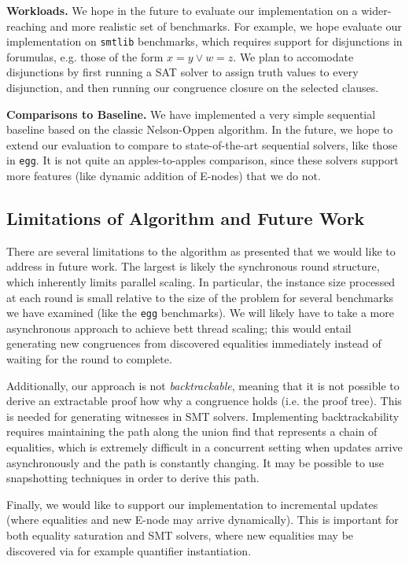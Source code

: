 \textbf{Workloads.} We hope in the future to evaluate our implementation on a wider-reaching and more realistic set of benchmarks. For example, we hope evaluate our implementation on \texttt{smtlib} benchmarks, which requires support for disjunctions in forumulas, e.g. those of the form $x = y \vee w = z$. We plan to accomodate disjunctions by first running a SAT solver to assign truth values to every disjunction, and then running our congruence closure on the selected clauses.

\textbf{Comparisons to Baseline.} We have implemented a very simple sequential baseline based on the classic Nelson-Oppen algorithm. In the future, we hope to extend our evaluation to compare to state-of-the-art sequential solvers, like those in \texttt{egg}. It is not quite an apples-to-apples comparison, since these solvers support more features (like dynamic addition of E-nodes) that we do not.

\subsection{Limitations of Algorithm and Future Work}

There are several limitations to the algorithm as presented that we would like to address in future work. The largest is likely the synchronous round structure, which inherently limits parallel scaling. In particular, the instance size processed at each round is small relative to the size of the problem for several benchmarks we have examined (like the \texttt{egg} benchmarks). We will likely have to take a more asynchronous approach to achieve bett thread scaling; this would entail generating new congruences from discovered equalities immediately instead of waiting for the round to complete.

Additionally, our approach is not \textit{backtrackable}, meaning that it is not possible to derive an extractable proof how why a congruence holds (i.e. the proof tree). This is needed for generating witnesses in SMT solvers. Implementing backtrackability requires maintaining the path along the union find that represents a chain of equalities, which is extremely difficult in a concurrent setting when updates arrive asynchronously and the path is constantly changing. It may be possible to use snapshotting techniques in order to derive this path.

Finally, we would like to support our implementation to incremental updates (where equalities and new E-node may arrive dynamically). This is important for both equality saturation and SMT solvers, where new equalities may be discovered via for example quantifier instantiation.
